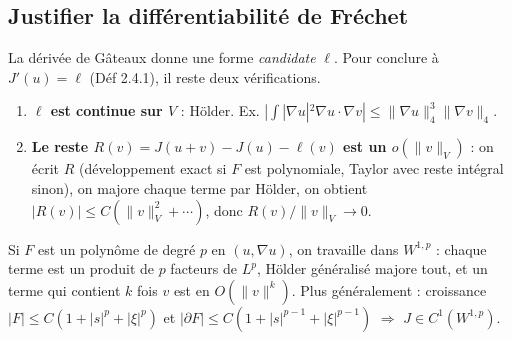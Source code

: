 \documentclass[10pt,a4paper]{article}
\newcommand{\nr}[1]{\|#1\|}
\begin{document}
\subsection{Justifier la différentiabilité de Fréchet}\label{sec:frechet}
La dérivée de Gâteaux donne une forme \emph{candidate} $\ell$. Pour conclure à $J'(u)=\ell$ (Déf 2.4.1), il reste deux vérifications.
\begin{enumerate}
\item \textbf{$\ell$ est continue sur $V$} : Hölder. Ex. $|\int|\nabla u|^2\nabla u\cdot\nabla v|\le\nr{\nabla u}_4^3\nr{\nabla v}_4$.
\item \textbf{Le reste $R(v)=J(u+v)-J(u)-\ell(v)$ est un $o(\nr v_V)$} : on écrit $R$ (développement exact si $F$ est polynomiale, Taylor avec reste intégral sinon), on majore chaque terme par Hölder, on obtient $|R(v)|\le C(\nr v_V^2+\cdots)$, donc $R(v)/\nr v_V\to0$.
\end{enumerate}
\begin{retenir}[ : la règle d'or]
Si $F$ est un polynôme de degré $p$ en $(u,\nabla u)$, on travaille dans $W^{1,p}$ : chaque terme est un produit de $p$ facteurs de $L^p$, Hölder généralisé majore tout, et un terme qui contient $k$ fois $v$ est en $O(\nr v^k)$. Plus généralement : croissance $|F|\le C(1+|s|^p+|\xi|^p)$ et $|\partial F|\le C(1+|s|^{p-1}+|\xi|^{p-1})$ $\Rightarrow$ $J\in C^1(W^{1,p})$.
\end{retenir}
\end{document}

